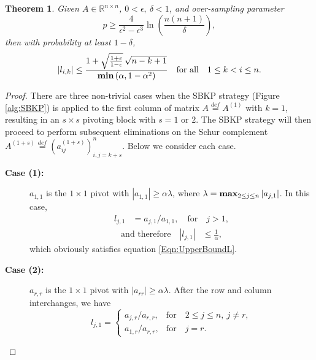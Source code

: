 \documentclass[11pt]{article}
\newtheorem{theorem}{Theorem}[section]
\begin{document}
\begin{theorem}\label{Thm:Upper Bounds on L entries}
Given $A \in \mathbb{R}^{n \times n}$, $0 < \epsilon, ~\delta < 1$, and over-sampling parameter 
\[{\displaystyle p \ge \frac{4}{\epsilon^2 - \epsilon^3} \ln{ \left( \frac{n(n + 1)}{\delta} \right) },} \]
then with probability at least $1 -\delta$,  
\begin{equation}\label{Eqn:UpperBoundL}
 {\displaystyle \left| l_{i,k} \right| \le \frac{1 + \sqrt{\frac{1 + \epsilon}{1 - \epsilon}}\, \sqrt{n - k + 1}}{{\bf min}\left(\alpha, 1 - \alpha^2\right)}} \quad \mbox{for all}\quad 1 \le k < i \le n. 
 \end{equation}
\end{theorem}

\begin{proof} There are three non-trivial cases when the SBKP strategy (Figure \ref{alg:SBKP}) is applied to the first column of matrix $A \stackrel{def}{=} A^{(1)}$ with $k = 1$, resulting in an $s \times s$ pivoting block with $s = 1$ or $2$. The SBKP strategy will then proceed to perform subsequent eliminations on the Schur complement $A^{(1 + s)}\stackrel{def}{=}\left(a_{i j}^{(1+s)}\right)_{i,j = k+s}^n$. Below we consider each case. 

\begin{description}
\item[{\bf Case (1):}] $a_{1,1}$ is the $1 \times 1$ pivot with $\left| a_{1,1} \right| \ge \alpha \lambda$, where $\lambda = {\bf max}_{2 \le j \le n} \left|a_{j,1}\right|$. In this case, 
\begin{align*}
l_{j, 1} & = a_{j, 1} / a_{1,1}, \quad \mbox{for}\quad j > 1, \end{align*}
\begin{align*}
\mbox{and therefore} \quad \left| l_{j, 1} \right|  & \le \frac{1}{\alpha},
\end{align*}
which obviously satisfies equation \eqref{Eqn:UpperBoundL}. 
\item[{\bf Case (2):}] $a_{r, r}$ is the $1 \times 1$ pivot with $\left| a_{r r} \right| \ge \alpha \lambda$. After the row and column interchanges, we have 
\begin{equation}\label{Eqn:lj1}
l_{j, 1} = \left\{\begin{array}{ll} 
a_{j, r} / a_{r, r}, & \mbox{for}\quad 2 \le j \le n, ~j \not= r, \\
a_{1, r} / a_{r, r}, & \mbox{for}\quad j = r.\end{array}\right.
\end{equation}


\end{description}
\end{proof}
\end{document}
